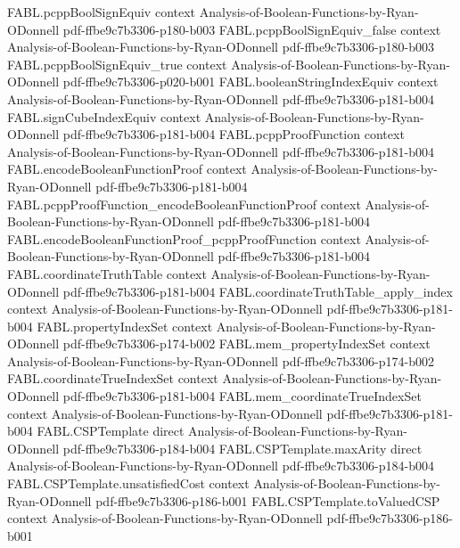 \begin{theorem}
  {FABL.pcppBoolSignEquiv}
  {context}
  {Analysis-of-Boolean-Functions-by-Ryan-ODonnell}
  {pdf-ffbe9c7b3306-p180-b003}
\proofstep
  {FABL.pcppBoolSignEquiv_false}
  {context}
  {Analysis-of-Boolean-Functions-by-Ryan-ODonnell}
  {pdf-ffbe9c7b3306-p180-b003}
\proofstep
  {FABL.pcppBoolSignEquiv_true}
  {context}
  {Analysis-of-Boolean-Functions-by-Ryan-ODonnell}
  {pdf-ffbe9c7b3306-p020-b001}
\proofstep
  {FABL.booleanStringIndexEquiv}
  {context}
  {Analysis-of-Boolean-Functions-by-Ryan-ODonnell}
  {pdf-ffbe9c7b3306-p181-b004}
\proofstep
  {FABL.signCubeIndexEquiv}
  {context}
  {Analysis-of-Boolean-Functions-by-Ryan-ODonnell}
  {pdf-ffbe9c7b3306-p181-b004}
\proofstep
  {FABL.pcppProofFunction}
  {context}
  {Analysis-of-Boolean-Functions-by-Ryan-ODonnell}
  {pdf-ffbe9c7b3306-p181-b004}
\proofstep
  {FABL.encodeBooleanFunctionProof}
  {context}
  {Analysis-of-Boolean-Functions-by-Ryan-ODonnell}
  {pdf-ffbe9c7b3306-p181-b004}
\proofstep
  {FABL.pcppProofFunction_encodeBooleanFunctionProof}
  {context}
  {Analysis-of-Boolean-Functions-by-Ryan-ODonnell}
  {pdf-ffbe9c7b3306-p181-b004}
\proofstep
  {FABL.encodeBooleanFunctionProof_pcppProofFunction}
  {context}
  {Analysis-of-Boolean-Functions-by-Ryan-ODonnell}
  {pdf-ffbe9c7b3306-p181-b004}
\proofstep
  {FABL.coordinateTruthTable}
  {context}
  {Analysis-of-Boolean-Functions-by-Ryan-ODonnell}
  {pdf-ffbe9c7b3306-p181-b004}
\proofstep
  {FABL.coordinateTruthTable_apply_index}
  {context}
  {Analysis-of-Boolean-Functions-by-Ryan-ODonnell}
  {pdf-ffbe9c7b3306-p181-b004}
\proofstep
  {FABL.propertyIndexSet}
  {context}
  {Analysis-of-Boolean-Functions-by-Ryan-ODonnell}
  {pdf-ffbe9c7b3306-p174-b002}
\proofstep
  {FABL.mem_propertyIndexSet}
  {context}
  {Analysis-of-Boolean-Functions-by-Ryan-ODonnell}
  {pdf-ffbe9c7b3306-p174-b002}
\proofstep
  {FABL.coordinateTrueIndexSet}
  {context}
  {Analysis-of-Boolean-Functions-by-Ryan-ODonnell}
  {pdf-ffbe9c7b3306-p181-b004}
\proofstep
  {FABL.mem_coordinateTrueIndexSet}
  {context}
  {Analysis-of-Boolean-Functions-by-Ryan-ODonnell}
  {pdf-ffbe9c7b3306-p181-b004}
\proofstep
  {FABL.CSPTemplate}
  {direct}
  {Analysis-of-Boolean-Functions-by-Ryan-ODonnell}
  {pdf-ffbe9c7b3306-p184-b004}
\proofstep
  {FABL.CSPTemplate.maxArity}
  {direct}
  {Analysis-of-Boolean-Functions-by-Ryan-ODonnell}
  {pdf-ffbe9c7b3306-p184-b004}
\proofstep
  {FABL.CSPTemplate.unsatisfiedCost}
  {context}
  {Analysis-of-Boolean-Functions-by-Ryan-ODonnell}
  {pdf-ffbe9c7b3306-p186-b001}
\proofstep
  {FABL.CSPTemplate.toValuedCSP}
  {context}
  {Analysis-of-Boolean-Functions-by-Ryan-ODonnell}
  {pdf-ffbe9c7b3306-p186-b001}

\end{theorem}
